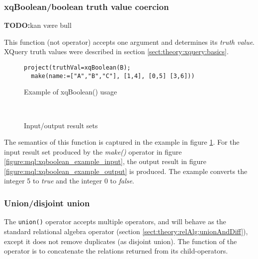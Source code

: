 \subsubsection{xqBoolean/boolean truth value coercion}
\textbf{\LARGE TODO:}kan v\ae re bull

This function (not operator) accepts one argument and determines its
\textit{truth value}. XQuery truth values were described in
section \ref{sect:theory:xquery:basics}.

\begin{figure}[!h]
\centering
\begin{Verbatim}
project(truthVal=xqBoolean(B); 
  make(name:=["A","B","C"], [1,4], [0,5] [3,6]))
\end{Verbatim}
\caption{Example of xqBoolean() usage}
\label{figure:mql:xqboolean_example}
\end{figure}

\begin{figure}[!h]
\centering
\mbox{
\quad
{}
}
\caption{Input/output result sets}
\end{figure}

The semantics of this function is captured in the example in figure
\ref{figure:mql:xqboolean_example}. For the input result set produced by the
\textit{make()} operator in figure \ref{figure:mql:xqboolean_example_input},
the output result in figure \ref{figure:mql:xqboolean_example_output} is
produced. The example converts the integer 5 to \textit{true} and the integer 0
to \textit{false}. 

\subsubsection{Union/disjoint union}
The \texttt{union()} operator accepts multiple operators, and will behave as the standard relational algebra
operator (section \ref{sect:theory:relAlg:unionAndDiff}), except it does not remove duplicates (as disjoint
union). The function of the operator is to concatenate the relations returned from its child-operators.